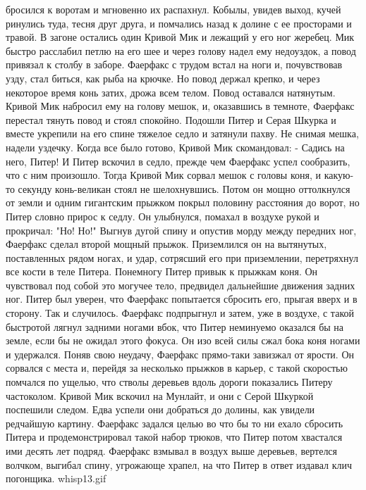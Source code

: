 бросился к воротам и мгновенно их распахнул. Кобылы, увидев выход, 
кучей ринулись туда, тесня друг друга, и помчались назад к долине с ее 
просторами и травой.
    В загоне остались один Кривой Мик и лежащий у его ног жеребец. Мик 
быстро расслабил петлю на его шее и через голову надел ему недоуздок, 
а повод привязал к столбу в заборе. Фаерфакс с трудом встал на ноги и, 
почувствовав узду, стал биться, как рыба на крючке. Но повод держал 
крепко, и через некоторое время конь затих, дрожа всем телом. Повод 
оставался натянутым.
    Кривой Мик набросил ему на голову мешок, и, оказавшись в темноте, 
Фаерфакс перестал тянуть повод и стоял спокойно.
    Подошли Питер и Серая Шкурка и вместе укрепили на его спине 
тяжелое седло и затянули пахву. Не снимая мешка, надели уздечку. Когда 
все было готово, Кривой Мик скомандовал:
    - Садись на него, Питер!
    И Питер вскочил в седло, прежде чем Фаерфакс успел сообразить, что 
с ним произошло.
    Тогда Кривой Мик сорвал мешок с головы коня, и какую-то секунду 
конь-великан стоял не шелохнувшись. Потом он мощно оттолкнулся от 
земли и одним гигантским прыжком покрыл половину расстояния до ворот, 
но Питер словно прирос к седлу. Он улыбнулся, помахал в воздухе рукой 
и прокричал: "Но! Но!" Выгнув дугой спину и опустив морду между 
передних ног, Фаерфакс сделал второй мощный прыжок. Приземлился он на 
вытянутых, поставленных рядом ногах, и удар, сотрясший его при 
приземлении, перетряхнул все кости в теле Питера.
    Понемногу Питер привык к прыжкам коня. Он чувствовал под собой это 
могучее тело, предвидел дальнейшие движения задних ног. Питер был 
уверен, что Фаерфакс попытается сбросить его, прыгая вверх и в 
сторону. Так и случилось. Фаерфакс подпрыгнул и затем, уже в воздухе, 
с такой быстротой лягнул задними ногами вбок, что Питер неминуемо 
оказался бы на земле, если бы не ожидал этого фокуса. Он изо всей силы 
сжал бока коня ногами и удержался.
    Поняв свою неудачу, Фаерфакс прямо-таки завизжал от ярости. Он 
сорвался с места и, перейдя за несколько прыжков в карьер, с такой 
скоростью помчался по ущелью, что стволы деревьев вдоль дороги 
показались Питеру частоколом.
    Кривой Мик вскочил на Мунлайт, и они с Серой Шкуркой поспешили 
следом. Едва успели они добраться до долины, как увидели редчайшую 
картину. Фаерфакс задался целью во что бы то ни ехало сбросить Питера 
и продемонстрировал такой набор трюков, что Питер потом хвастался ими 
десять лет подряд. Фаерфакс взмывал в воздух выше деревьев, вертелся 
волчком, выгибал спину, угрожающе храпел, на что Питер в ответ издавал 
клич погонщика.
    {whisp13.gif}
